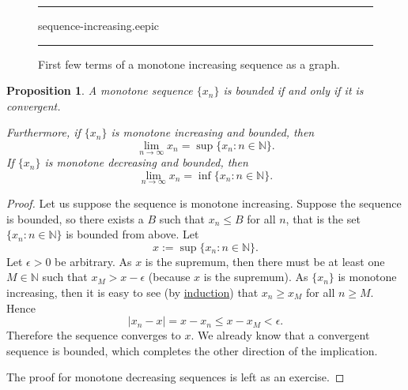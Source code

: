\documentclass[12pt]{book}
\newenvironment{myfigureht}{%
\begin{figure}[h!t]
\noindent\rule{\textwidth}{0.4pt}\vspace{12pt}\par\centering}%
{\par\noindent\rule{\textwidth}{0.4pt}
\end{figure}}
\newcommand{\abs}[1]{\left\lvert {#1} \right\rvert}
\newcommand{\N}{{\mathbb{N}}}
\theoremstyle{plain}
\newtheorem{prop}[thm]{Proposition}
\theoremstyle{remark}
\theoremstyle{definition}
\theoremstyle{exercise}
\theoremstyle{example}
\begin{document}
\begin{myfigureht}
{sequence-increasing.eepic}
\caption{First few terms of a monotone increasing sequence as a
graph.\label{figsequenceincreasing}}
\end{myfigureht}

\begin{prop} \label{prop:monotoneconv}
A monotone sequence $\{ x_n \}$ is bounded if and only if it is convergent.

Furthermore, if $\{ x_n \}$ is monotone increasing and bounded, then
\begin{equation*}
\lim_{n\to \infty} x_n = \sup \{ x_n : n \in \N \} .
\end{equation*}
If $\{ x_n \}$ is monotone decreasing and bounded, then
\begin{equation*}
\lim_{n\to \infty} x_n = \inf \{ x_n : n \in \N \} .
\end{equation*}
\end{prop}

\begin{proof}
Let us suppose the sequence is monotone increasing.  Suppose 
the sequence is bounded, so there exists a $B$
such that $x_n \leq B$ for all $n$, that is the set
$\{ x_n : n \in  \N \}$ is bounded from above.  Let
\begin{equation*}
x := \sup \{ x_n : n \in \N \} .
\end{equation*}
Let $\epsilon > 0$ be arbitrary.  As $x$ is the supremum, then
there must be at least one $M \in \N$ such that $x_{M} > x-\epsilon$
(because $x$ is the supremum).  As $\{ x_n \}$ is monotone increasing,
then it is easy to see (by \hyperref[induction:thm]{induction}) that
$x_n \geq x_{M}$ for all $n \geq M$.  Hence
\begin{equation*}
\abs{x_n-x} = x-x_n \leq x-x_{M} < \epsilon  .
\end{equation*}
Therefore the sequence converges to $x$.
We already know that a convergent sequence is bounded, which completes the
other direction of the implication.

The proof for monotone decreasing sequences is left as an exercise.
\end{proof}
\end{document}
